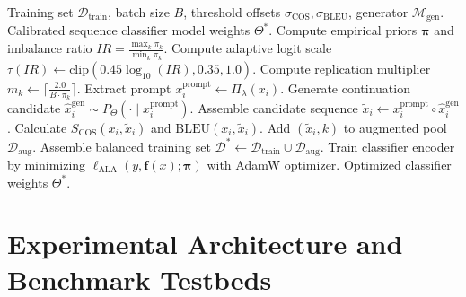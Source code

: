 \documentclass[final,5p,times,twocolumn]{elsarticle}
\begin{document}
\begin{algorithm}[!t]
\caption{Density-Constrained Augmentation and Adaptive Logit Calibration Pipeline}
\label{alg:unified_pipeline}
\begin{algorithmic}[1]
\REQUIRE Training set $\mathcal{D}_{\text{train}}$, batch size $B$, threshold offsets $\sigma_{\text{COS}}, \sigma_{\text{BLEU}}$, generator $\mathcal{M}_{\text{gen}}$.
\ENSURE Calibrated sequence classifier model weights $\Theta^*$.
\STATE Compute empirical priors $\boldsymbol{\pi}$ and imbalance ratio $IR = \frac{\max_k \pi_k}{\min_k \pi_k}$.
\STATE Compute adaptive logit scale $\tau(IR) \leftarrow \mathrm{clip}(0.45 \log_{10}(IR), 0.35, 1.0)$.
    \STATE Compute replication multiplier $m_k \leftarrow \lceil \frac{2.0}{B \cdot \pi_k} \rceil$.
        \STATE Extract prompt $x_i^{\text{prompt}} \leftarrow \Pi_\lambda(x_i)$.
        \STATE Generate continuation candidate $\hat{x}_i^{\text{gen}} \sim P_\Theta(\cdot \mid x_i^{\text{prompt}})$.
        \STATE Assemble candidate sequence $\tilde{x}_i \leftarrow x_i^{\text{prompt}} \circ \hat{x}_i^{\text{gen}}$.
        \STATE Calculate $S_{\text{COS}}(x_i, \tilde{x}_i)$ and $\text{BLEU}(x_i, \tilde{x}_i)$.
            \STATE Add $(\tilde{x}_i, k)$ to augmented pool $\mathcal{D}_{\text{aug}}$.
        \ENDIF
    \ENDFOR
\ENDFOR
\STATE Assemble balanced training set $\mathcal{D}^* \leftarrow \mathcal{D}_{\text{train}} \cup \mathcal{D}_{\text{aug}}$.
\STATE Train classifier encoder by minimizing $\ell_{\text{ALA}}(y, \mathbf{f}(x); \boldsymbol{\pi})$ with AdamW optimizer.
\RETURN Optimized classifier weights $\Theta^*$.
\end{algorithmic}
\end{algorithm}

\section{Experimental Architecture and Benchmark Testbeds}
\label{sec:experimental_setup}
\end{document}
